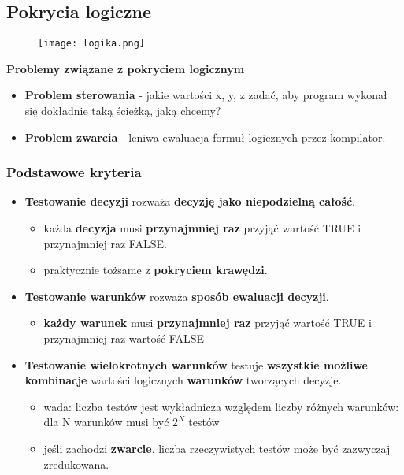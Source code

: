 \documentclass[../main.tex]{subfiles}
\begin{document}
    \subsection{Pokrycia logiczne}

    \begin{figure}[H]
        \texttt{[image: logika.png]}
    \end{figure}

    \textbf{Problemy związane z pokryciem logicznym}
    \begin{itemize}
        \item \textbf{Problem sterowania} - jakie wartości x, y, z zadać, aby program wykonał się dokładnie taką ścieżką,
        jaką chcemy?

        \item \textbf{Problem zwarcia} - leniwa ewaluacja formuł logicznych przez kompilator.
    \end{itemize}

    \subsubsection{Podstawowe kryteria}

    \begin{itemize}
        \item \textbf{Testowanie decyzji} rozważa \textbf{decyzję jako niepodzielną całość}.
        \begin{itemize}
            \item każda \textbf{decyzja} musi \textbf{przynajmniej raz} przyjąć wartość TRUE i przynajmniej raz FALSE.
            \item praktycznie tożsame z \textbf{pokryciem krawędzi}.
        \end{itemize}

        \item \textbf{Testowanie warunków} rozważa \textbf{sposób ewaluacji decyzji}.
        \begin{itemize}
            \item \textbf{każdy warunek} musi \textbf{przynajmniej raz} przyjąć wartość TRUE i przynajmniej raz wartość FALSE
        \end{itemize}

        \item \textbf{Testowanie wielokrotnych warunków} testuje \textbf{wszystkie możliwe kombinacje} wartości
        logicznych \textbf{warunków} tworzących decyzje.
        \begin{itemize}
            \item wada: liczba testów jest wykładnicza względem liczby różnych
            warunków: dla N warunków musi być $2^N$ testów
            \item jeśli zachodzi \textbf{zwarcie}, liczba rzeczywistych testów może być zazwyczaj zredukowana.

        \end{itemize}
    \end{itemize}
\end{document}
